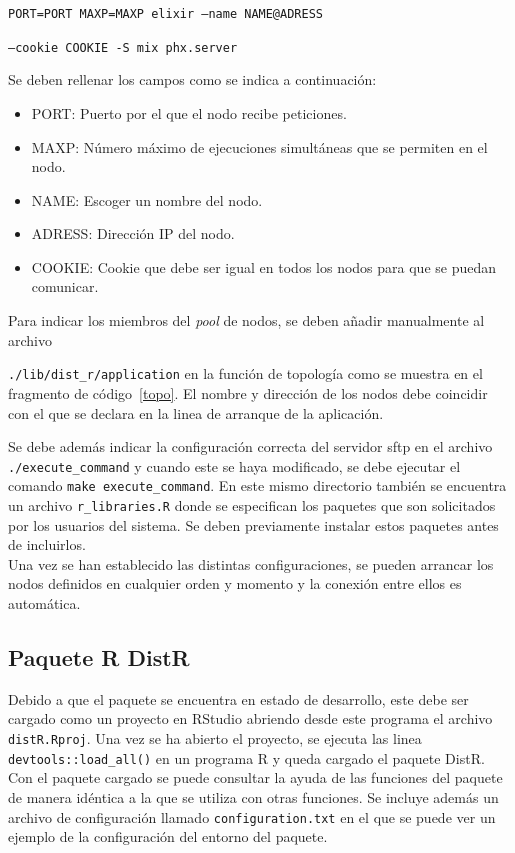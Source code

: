 \texttt{PORT=PORT MAXP=MAXP elixir --name NAME@ADRESS }

\texttt{--cookie COOKIE  -S mix phx.server}

Se deben rellenar los campos como se indica a continuación:
\begin{itemize}
    \item PORT: Puerto por el que el nodo recibe peticiones.
    \item MAXP: Número máximo de ejecuciones simultáneas que se permiten en el nodo.
    \item NAME: Escoger un nombre del nodo.
    \item ADRESS: Dirección IP del nodo.
    \item COOKIE: Cookie que debe ser igual en todos los nodos para que se puedan comunicar.
\end{itemize}

Para indicar los miembros del \textit{pool} de nodos, se deben añadir manualmente al archivo 

\texttt{./lib/dist_r/application} en la función de topología como se muestra en el fragmento de código~\ref{topo}. El nombre y dirección de los nodos debe coincidir con el que se declara en la linea de arranque de la aplicación.

Se debe además indicar la configuración correcta del servidor sftp en el archivo \texttt{./execute_command} y cuando este se haya modificado, se debe ejecutar el comando \texttt{make execute_command}. En este mismo directorio también se encuentra un archivo \texttt{r\_libraries.R} donde se especifican los paquetes que son solicitados por los usuarios del sistema. Se deben previamente instalar estos paquetes antes de incluirlos.
\\ 
Una vez se han establecido las distintas configuraciones, se pueden arrancar los nodos definidos en cualquier orden y momento y la conexión entre ellos es automática.

\subsection{Paquete R DistR}
Debido a que el paquete se encuentra en estado de desarrollo, este debe ser cargado como un proyecto en RStudio abriendo desde este programa el archivo \texttt{distR.Rproj}. Una vez se ha abierto el proyecto, se ejecuta las linea \texttt{devtools::load\_all()} en un programa R y queda cargado el paquete DistR. Con el paquete cargado se puede consultar la ayuda de las funciones del paquete de manera idéntica a la que se utiliza con otras funciones. Se incluye además un archivo de configuración llamado \texttt{configuration.txt} en el que se puede ver un ejemplo de la configuración del entorno del paquete.
